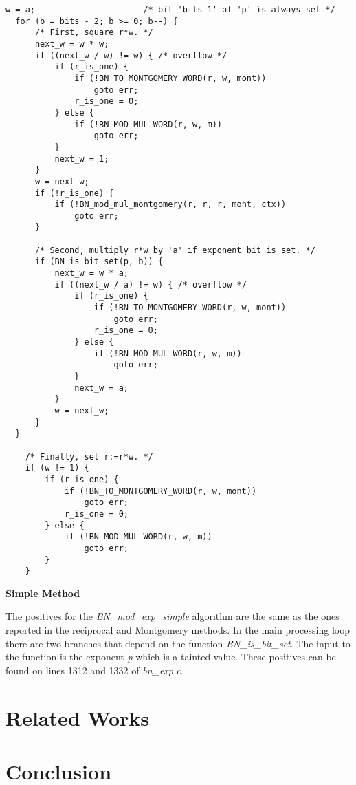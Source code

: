 \documentclass[11pt,a4paper]{article}
\newcommand{\codevar}[1]{\textit{#1}}
\newcommand{\codefn}[1]{\textit{#1}}
\newcommand{\codefile}[1]{\textit{#1}}
\newcommand{\ruleabove}{}
\newcommand{\rulebelow}{}
\begin{document}
\ruleabove
\begin{lstlisting}[caption=OpenSSL 1.1.0g - bn\_exp.c lines 1178-1227]
  w = a;                      /* bit 'bits-1' of 'p' is always set */
  for (b = bits - 2; b >= 0; b--) {
      /* First, square r*w. */
      next_w = w * w;
      if ((next_w / w) != w) { /* overflow */
          if (r_is_one) {
              if (!BN_TO_MONTGOMERY_WORD(r, w, mont))
                  goto err;
              r_is_one = 0;
          } else {
              if (!BN_MOD_MUL_WORD(r, w, m))
                  goto err;
          }
          next_w = 1;
      }
      w = next_w;
      if (!r_is_one) {
          if (!BN_mod_mul_montgomery(r, r, r, mont, ctx))
              goto err;
      }

      /* Second, multiply r*w by 'a' if exponent bit is set. */
      if (BN_is_bit_set(p, b)) {
          next_w = w * a;
          if ((next_w / a) != w) { /* overflow */
              if (r_is_one) {
                  if (!BN_TO_MONTGOMERY_WORD(r, w, mont))
                      goto err;
                  r_is_one = 0;
              } else {
                  if (!BN_MOD_MUL_WORD(r, w, m))
                      goto err;
              }
              next_w = a;
          }
          w = next_w;
      }
  }

    /* Finally, set r:=r*w. */
    if (w != 1) {
        if (r_is_one) {
            if (!BN_TO_MONTGOMERY_WORD(r, w, mont))
                goto err;
            r_is_one = 0;
        } else {
            if (!BN_MOD_MUL_WORD(r, w, m))
                goto err;
        }
    }
\end{lstlisting}
\rulebelow

\noindent
\textbf{Simple Method}

   The positives for the \codefn{BN\_mod\_exp\_simple} algorithm are the same as the ones
   reported in the reciprocal and Montgomery methods. In the main processing loop
   there are two branches that depend on the function \codefn{BN\_is\_bit\_set}. The input
   to the function is the exponent \codevar{p} which is a tainted value. These positives
   can be found on lines 1312 and 1332 of \codefile{bn\_exp.c}.
\section{Related Works}

\section{Conclusion}

{}

\end{document}

